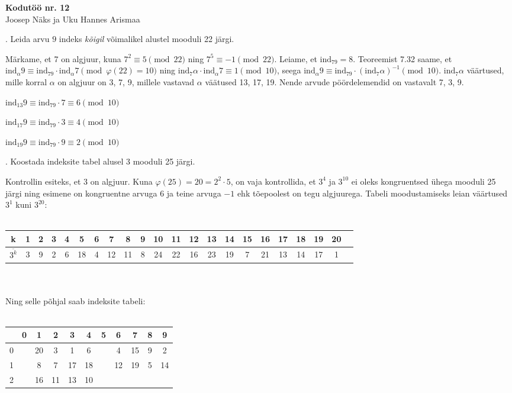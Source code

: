 \documentclass[a4paper, 10pt]{article}
\newcommand{\w}{\overline}
\newcommand{\ind}{\mathrm{ind}}
\begin{document}
\begin{center}
\Large\textbf{Kodutöö nr. 12}\\
\small{Joosep Näks ja Uku Hannes Arismaa}
\end{center}

\bigskip

\bigskip

. Leida arvu $9$ indeks \emph{kõigil} võimalikel alustel mooduli 22 järgi. 

\bigskip 
Märkame, et 7 on algjuur, kuna $7^2\equiv5\pmod{22}$ ning $7^5\equiv -1\pmod{22}$. Leiame, et $\ind_79=8$. Teoreemist 7.32 saame, et $\ind_\alpha9\equiv\ind_79\cdot\ind_\alpha7\pmod{\varphi(22)=10}$ ning $\ind_7\alpha\cdot\ind_\alpha7\equiv1\pmod{10}$, seega $\ind_\alpha9\equiv\ind_79\cdot(\ind_7\alpha)^{-1}\pmod{10}$. $\ind_7\alpha$ väärtused, mille korral $\alpha$ on algjuur on 3, 7, 9, millele vastavad $\alpha$ väätused 13, 17, 19. Nende arvude pöördelemendid on vastavalt 7, 3, 9. 

$\ind_{13}9\equiv\ind_79\cdot7\equiv 6\pmod{10}$

$\ind_{17}9\equiv\ind_79\cdot3\equiv 4\pmod{10}$

$\ind_{19}9\equiv\ind_79\cdot9\equiv 2\pmod{10}$
\bigskip

. Koostada indeksite tabel alusel 3 mooduli 25 järgi. 

\bigskip
Kontrollin esiteks, et 3 on algjuur. Kuna $\varphi(25)=20=2^2\cdot5$, on vaja kontrollida, et $3^4$ ja $3^10$ ei oleks kongruentsed ühega mooduli 25 järgi ning esimene on kongruentne arvuga 6 ja teine arvuga $-1$ ehk tõepoolest on tegu algjuurega. Tabeli moodustamiseks leian väärtused $3^1$ kuni $3^{20}$:\\\\
\begin{tabular}{c|ccccccccccccccccccccc}
k&1&2&3&4&5&6&7&8&9&10&11&12&13&14&15&16&17&18&19&20\\
\hline
$\w{3^k}$&3&9&2&6&18&4&12&11&8&24&22&16&23&19&7&21&13&14&17&1
\end{tabular}\\\\
Ning selle põhjal saab indeksite tabeli:\\\\
\begin{tabular}{|c|cccccccccc|}
\hline
&0&1&2&3&4&5&6&7&8&9\\
\hline
0&&20&3&1&6&&4&15&9&2\\
1&&8&7&17&18&&12&19&5&14\\
2&&16&11&13&10&&&&&\\
\hline
\end{tabular}
\bigskip
\end{document}
